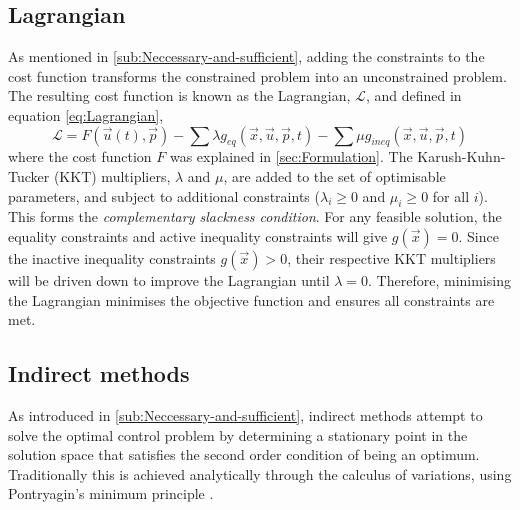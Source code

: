 \subsection{Lagrangian} \label{sub:Lagrangian}

As mentioned in \autoref{sub:Neccessary-and-sufficient}, adding the constraints to the cost function transforms the constrained problem into an unconstrained problem. The resulting cost function is known as the Lagrangian, $\mathcal{L}$, and defined in equation \eqref{eq:Lagrangian},
\begin{equation} \label{eq:Lagrangian}
\mathcal{L} = F(\vec{u}(t),\vec{p}) - \sum\lambda g_{eq}(\vec{x},\vec{u},\vec{p},t) - \sum\mu g_{ineq}(\vec{x},\vec{u},\vec{p},t)
\end{equation}
where the cost function $F$ was explained in \autoref{sec:Formulation}. The Karush-Kuhn-Tucker (KKT) multipliers, $\lambda$ and $\mu$, are added to the set of optimisable parameters, and subject to additional constraints ($\lambda_i\ge0$ and $\mu_i\ge0$ for all $i$). This forms the \emph{complementary slackness condition}. For any feasible solution, the equality constraints and active inequality constraints will give $g(\vec{x})=0$.  Since the inactive inequality constraints $g(\vec{x})>0$, their respective KKT multipliers will be driven down to improve the Lagrangian until $\lambda=0$. Therefore, minimising the Lagrangian minimises the objective function and ensures all constraints are met.

\subsection{Indirect methods}

As introduced in \autoref{sub:Neccessary-and-sufficient}, indirect methods attempt to solve the optimal control problem by determining a stationary point in the solution space that satisfies the second order condition of being an optimum. Traditionally this is achieved analytically through the calculus of variations, using Pontryagin's minimum principle \parencite{Pontryagin1962}. 

